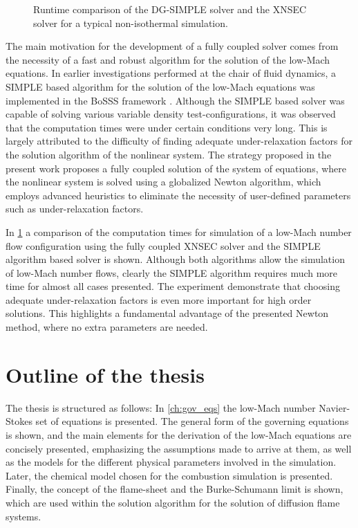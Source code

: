 \begin{figure}[t]	
	\centering
	\caption{Runtime comparison of the DG-SIMPLE solver and the XNSEC solver for a typical non-isothermal simulation.}
	\label{fig:RuntimeComparisonk2}
\end{figure}
The main motivation for the development of a fully coupled solver comes from the necessity of a fast and robust algorithm for the solution of the low-Mach equations. In earlier investigations performed at the chair of fluid dynamics, a SIMPLE based algorithm for the solution of the low-Mach equations was implemented in the \gls{BoSSS} framework \parencite{kleinSIMPLEBasedDiscontinuous2013,kleinExtensionSIMPLEBased2015,kleinHighorderDiscontinuousGalerkin2016}. Although the SIMPLE based solver was capable of solving various variable density test-configurations, it was observed that the computation times were under certain conditions very long. This is largely attributed to the difficulty of finding adequate under-relaxation factors for the solution algorithm of the nonlinear system. The strategy proposed in the present work proposes a fully coupled solution of the system of equations, where the nonlinear system is solved using a globalized Newton algorithm, which employs advanced heuristics to eliminate the necessity of user-defined parameters such as under-relaxation factors.

In \cref{fig:RuntimeComparisonk2} a comparison of the computation times for simulation of a low-Mach number flow configuration using the fully coupled \gls{XNSEC} solver and the SIMPLE algorithm based solver is shown. Although both algorithms allow the simulation of low-Mach number flows, clearly the SIMPLE algorithm requires much more time for almost all cases presented. The experiment demonstrate that choosing adequate under-relaxation factors is even more important for high order solutions. This highlights a fundamental advantage of the presented Newton method, where no extra parameters are needed. 
\section{Outline of the thesis}

The thesis is structured as follows: In \cref{ch:gov_eqs} the low-Mach number Navier-Stokes set of equations is presented. The general form of the governing equations is shown, and the main elements for the derivation of the low-Mach equations are concisely presented, emphasizing the assumptions made to arrive at them, as well as the models for the different physical parameters involved in the simulation. Later, the chemical model chosen for the combustion simulation is presented. Finally, the concept of the flame-sheet and the Burke-Schumann limit is shown, which are used within the solution algorithm for the solution of diffusion flame systems.

